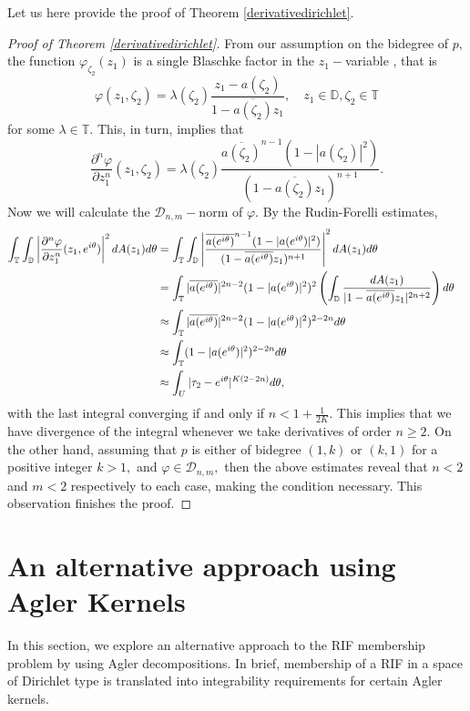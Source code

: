 \documentclass[11pt]{amsart}
\numberwithin{equation}{section}
\begin{document}
Let us here provide the proof of Theorem \ref{derivativedirichlet}.

\begin{proof}[Proof of Theorem \ref{derivativedirichlet}] From our assumption on the bidegree of $p$, the function $\varphi_{\zeta_2}(z_1)$ is a single Blaschke factor in the $z_1-$variable , that is $$\varphi(z_1,\zeta_2)=\lambda(\zeta_2)\frac{z_1-a(\zeta_2)}{1-\overline{a(\zeta_2)}z_1}, \quad z_1\in\mathbb{D}, \zeta_2\in\mathbb{T}$$ for some $\lambda\in\mathbb{T}.$ 
This, in turn, implies that $$\frac{\partial^n{\varphi}}{\partial z_1^n}(z_1,\zeta_2)=\lambda(\zeta_2)\frac{\overline{a(\zeta_2)}^{n-1}(1-|a(\zeta_2)|^2)}{(1-\overline{a(\zeta_2)}z_1)^{n+1}}.$$
Now we will calculate the $\mathcal{D}_{n,m}-$norm of $\varphi.$ By the Rudin-Forelli estimates, 
\begin{align}
\int_{\mathbb{T}}\int_{\mathbb{D}}\left|\frac{\partial^n{\varphi}}{\partial z_1^n}(z_1,e^{i\theta})\right|^2dA(z_1)d\theta&=\int_{\mathbb{T}}\int_{\mathbb{D}}\left|\frac{\overline{a(e^{i\theta})}^{n-1}(1-|a(e^{i\theta})|^2)}{(1-\overline{a(e^{i\theta})}z_1)^{n+1}}\right|^2dA(z_1)d\theta &&\\
&= \int_{\mathbb{T}}|\overline{a(e^{i\theta})}|^{2n-2}(1-|a(e^{i\theta})|^2)^{2}\left(\int_{\mathbb{D}}\frac{dA(z_1)}{|1-\overline{a(e^{i\theta})}z_1|^{2n+2}}\right)d\theta\notag&&\\
&\approx \int_{\mathbb{T}}|\overline{a(e^{i\theta})}|^{2n-2}(1-|a(e^{i\theta})|^2)^{2-2n}d\theta \notag&&\\
&\approx \int_{\mathbb{T}}(1-|a(e^{i\theta})|^2)^{2-2n}d\theta \notag&&\\
&\approx \int_{U}|\tau_2-e^{i\theta}|^{K(2-2n)}d\theta, \notag
\end{align}
with the last integral converging if and only if $n<1+\frac{1}{2K}$. This implies that we have divergence of the integral whenever we take derivatives of order $n\geq 2$. On the other hand, assuming that $p$ is either of bidegree $(1,k)$ or $(k,1)$ for a positive integer $k>1,$ and $\varphi\in\mathcal{D}_{n,m},$ then the above estimates reveal that $n<2$ and $m<2$ respectively to each case, making the condition necessary. This observation finishes the proof.
\end{proof} 
\section{An alternative approach using Agler Kernels} \label{section 5}
In this section, we explore an alternative approach to the RIF membership problem by using Agler decompositions. In brief, membership of a RIF in a space of Dirichlet type is translated into integrability requirements for certain Agler kernels.
\end{document}
